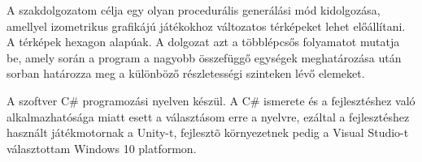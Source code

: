 
A szakdolgozatom célja egy olyan procedurális generálási mód kidolgozása, amellyel izometrikus grafikájú játékokhoz változatos térképeket lehet előállítani. A térképek hexagon alapúak. A dolgozat azt a többlépcsős folyamatot mutatja be, amely során a program a nagyobb összefüggő egységek meghatározása után sorban határozza meg a különböző részletességi szinteken lévő elemeket.

A szoftver C\# programozási nyelven készül. A C\# ismerete és a fejlesztéshez való alkalmazhatósága miatt esett a választásom erre a nyelvre, ezáltal a fejlesztéshez használt játékmotornak a Unity-t, fejlesztõ környezetnek pedig a Visual Studio-t választottam Windows 10 platformon.

